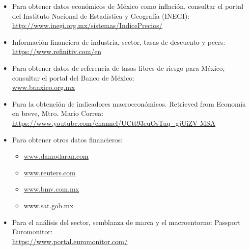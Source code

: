 \begin{itemize}

	\item Para obtener datos econ\'omicos de M\'exico como inflaci\'on, consultar el portal del Instituto Nacional de Estad\'istica y Geograf\'ia (INEGI):\\
	 \url{http://www.inegi.org.mx/sistemas/IndicePrecios/}

	\item Informaci\'on financiera de industria, sector, tasas de descuento y peers: \\
	\url{https://www.refinitiv.com/en}

	\item Para obtener datos de referencia de tasas libres de riesgo para M\'exico, consultar el portal del Banco de M\'exico:\\
\href{http://www.banxico.org.mx/SieInternet/consultarDirectorioInternetAction.do?accion=consultarCuadro&idCuadro=CF114&sector=18&locale=es}{www.banxico.org.mx}

	\item Para la obtenci\'on de indicadores macroecon\'omicos. Retrieved from Econom\'ia en breve, Mtro. Mario Correa:\\
	 \url{https://www.youtube.com/channel/UCtt93euOsTuq_gjUiZV-MSA}

	\item Para obtener otros datos financieros:
	\begin{itemize}

		\item \url{www.damodaran.com}
		\item \url{www.reuters.com}
		\item \url{www.bmv.com.mx}
		\item \url{www.sat.gob.mx}
	\end{itemize}
	\item Para el an\'alisis del sector, semblanza de marca y el macroentorno:
	Passport Euromonitor:\\
	 \url{https://www.portal.euromonitor.com/}
	 
\end{itemize}